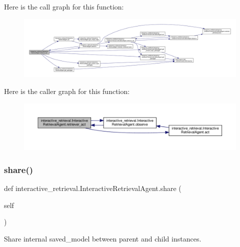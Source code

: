 Here is the call graph for this function\+:
\nopagebreak
\begin{figure}[H]
\begin{center}
\leavevmode
\includegraphics[width=350pt]{classinteractive__retrieval_1_1InteractiveRetrievalAgent_a07ae26123c56441549800bd116a86626_cgraph}
\end{center}
\end{figure}
Here is the caller graph for this function\+:
\nopagebreak
\begin{figure}[H]
\begin{center}
\leavevmode
\includegraphics[width=350pt]{classinteractive__retrieval_1_1InteractiveRetrievalAgent_a07ae26123c56441549800bd116a86626_icgraph}
\end{center}
\end{figure}
\mbox{\label{classinteractive__retrieval_1_1InteractiveRetrievalAgent_a36cc026e093f92e322b5a8c42cad556a}} 
\subsubsection{\texorpdfstring{share()}{share()}}
{\footnotesize\ttfamily def interactive\+\_\+retrieval.\+Interactive\+Retrieval\+Agent.\+share (\begin{DoxyParamCaption}\item[{}]{self }\end{DoxyParamCaption})}

\begin{DoxyVerb}Share internal saved_model between parent and child instances.\end{DoxyVerb}
 

